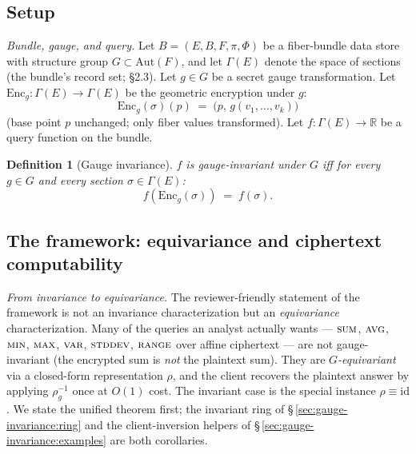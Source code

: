 \documentclass[11pt,letterpaper]{article}
\newtheorem{definition}[theorem]{Definition}
\begin{document}
\subsection{Setup}
\label{sec:gauge-invariance:setup}

\emph{Bundle, gauge, and query.}
Let $B = (E, B, F, \pi, \Phi)$ be a fiber-bundle data store with
structure group $G \subset \mathrm{Aut}(F)$, and let $\Gamma(E)$
denote the space of sections (the bundle's record set; §2.3). Let
$g \in G$ be a secret gauge transformation. Let
$\mathrm{Enc}_g: \Gamma(E) \to \Gamma(E)$ be the geometric encryption
under $g$:
\[
\mathrm{Enc}_g(\sigma)(p) \;=\; \bigl(p,\, g(v_1, \ldots, v_k)\bigr)
\]
(base point $p$ unchanged; only fiber values transformed). Let
$f: \Gamma(E) \to \mathbb{R}$ be a query function on the bundle.

\begin{definition}[Gauge invariance]
\label{def:gauge-invariance}
$f$ is \emph{gauge-invariant under $G$} iff for every $g \in G$ and
every section $\sigma \in \Gamma(E)$:
\[
f(\mathrm{Enc}_g(\sigma)) \;=\; f(\sigma).
\]
\end{definition}

\subsection{The framework: equivariance and ciphertext computability}
\label{sec:gauge-invariance:thm}

\emph{From invariance to equivariance.}
The reviewer-friendly statement of the framework is not an
invariance characterization but an \emph{equivariance}
characterization. Many of the queries an analyst actually wants ---
$\textsc{sum}$, $\textsc{avg}$, $\textsc{min}$, $\textsc{max}$,
$\textsc{var}$, $\textsc{stddev}$, $\textsc{range}$ over affine
ciphertext --- are not gauge-invariant (the encrypted sum is
\emph{not} the plaintext sum). They are
\emph{$G$-equivariant} via a closed-form representation $\rho$, and
the client recovers the plaintext answer by applying $\rho_g^{-1}$
once at $O(1)$ cost. The invariant case is the special instance
$\rho \equiv \mathrm{id}$. We state the unified theorem first; the
invariant ring of \S\,\ref{sec:gauge-invariance:ring} and the
client-inversion helpers of \S\,\ref{sec:gauge-invariance:examples}
are both corollaries.
\end{document}
